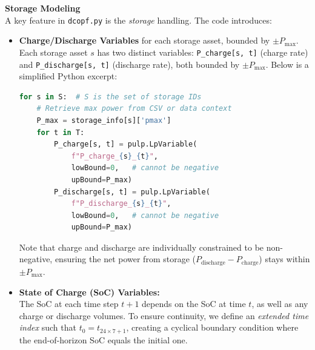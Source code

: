 \textbf{Storage Modeling}\\
A key feature in \texttt{dcopf.py} is the \emph{storage} handling. The code introduces:

\begin{itemize}
    \item \textbf{Charge/Discharge Variables} for each storage asset, bounded by $\pm P_{\max}$.
    Each storage asset $s$ has two distinct variables: 
    \lstinline|P_charge[s, t]| (charge rate) and \lstinline|P_discharge[s, t]| (discharge rate),
    both bounded by $\pm P_{\max}$. Below is a simplified Python excerpt:

    \begin{lstlisting}[language=python]
for s in S:  # S is the set of storage IDs
    # Retrieve max power from CSV or data context
    P_max = storage_info[s]['pmax']
    for t in T:
        P_charge[s, t] = pulp.LpVariable(
            f"P_charge_{s}_{t}",
            lowBound=0,   # cannot be negative
            upBound=P_max)
        P_discharge[s, t] = pulp.LpVariable(
            f"P_discharge_{s}_{t}",
            lowBound=0,   # cannot be negative
            upBound=P_max)
    \end{lstlisting}
    Note that charge and discharge are individually constrained to be non-negative, ensuring 
    the net power from storage ($P_{\text{discharge}} - P_{\text{charge}}$) stays within $\pm P_{\max}$.

    \item \textbf{State of Charge (SoC) Variables:}\\
    The SoC at each time step $t+1$ depends on the SoC at time $t$, as well as any charge or discharge volumes. 
    To ensure continuity, we define an \emph{extended time index} such that $t_0 = t_{24 \times 7 + 1}$, 
    creating a cyclical boundary condition where the end-of-horizon SoC equals the initial one.

  \end{itemize}

